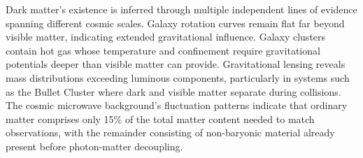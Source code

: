 Dark matter's existence is inferred through multiple independent lines of evidence spanning different cosmic scales. Galaxy rotation curves remain flat far beyond visible matter, indicating extended gravitational influence. Galaxy clusters contain hot gas whose temperature and confinement require gravitational potentials deeper than visible matter can provide. Gravitational lensing reveals mass distributions exceeding luminous components, particularly in systems such as the Bullet Cluster where dark and visible matter separate during collisions. The cosmic microwave background's fluctuation patterns indicate that ordinary matter comprises only 15\% of the total matter content needed to match observations, with the remainder consisting of non-baryonic material already present before photon-matter decoupling.
